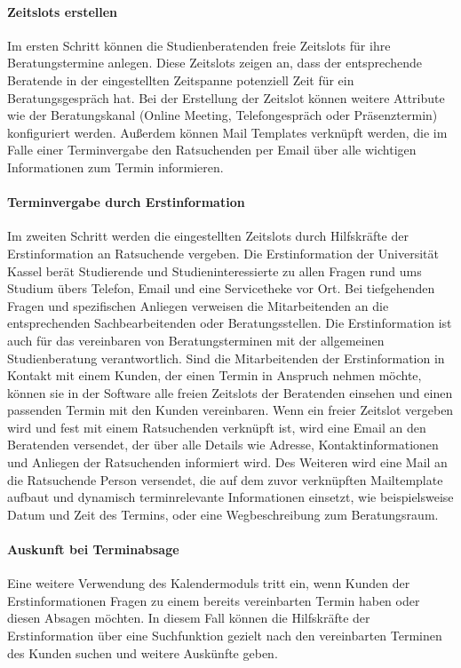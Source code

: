 \documentclass[12pt]{article}
\begin{document}
\paragraph{Zeitslots erstellen}
Im ersten Schritt können die Studienberatenden freie Zeitslots für ihre
Beratungstermine anlegen. Diese Zeitslots zeigen an, dass der entsprechende
Beratende in der eingestellten Zeitspanne potenziell Zeit für ein
Beratungsgespräch hat. Bei der Erstellung der Zeitslot können weitere Attribute
wie der Beratungskanal (Online Meeting, Telefongespräch oder Präsenztermin)
konfiguriert werden. Außerdem können Mail Templates verknüpft werden, die im
Falle einer Terminvergabe den Ratsuchenden per Email über alle wichtigen
Informationen zum Termin informieren.

\paragraph{Terminvergabe durch Erstinformation}
Im zweiten Schritt werden die eingestellten Zeitslots durch Hilfskräfte der
Erstinformation an Ratsuchende vergeben. Die Erstinformation der Universität
Kassel berät Studierende und Studieninteressierte zu allen Fragen rund ums
Studium übers Telefon, Email und eine Servicetheke vor Ort. Bei tiefgehenden
Fragen und spezifischen Anliegen verweisen die Mitarbeitenden an die
entsprechenden Sachbearbeitenden oder Beratungsstellen. Die Erstinformation ist
auch für das vereinbaren von Beratungsterminen mit der allgemeinen
Studienberatung verantwortlich. Sind die Mitarbeitenden der Erstinformation in
Kontakt mit einem Kunden, der einen Termin in Anspruch nehmen möchte, können
sie in der Software alle freien Zeitslots der Beratenden einsehen und einen
passenden Termin mit den Kunden vereinbaren. Wenn ein freier Zeitslot vergeben
wird und fest mit einem Ratsuchenden verknüpft ist, wird eine Email an den
Beratenden versendet, der über alle Details wie Adresse, Kontaktinformationen
und Anliegen der Ratsuchenden informiert wird. Des Weiteren wird eine Mail an
die Ratsuchende Person versendet, die auf dem zuvor verknüpften Mailtemplate
aufbaut und dynamisch terminrelevante Informationen einsetzt, wie
beispielsweise Datum und Zeit des Termins, oder eine Wegbeschreibung zum
Beratungsraum.

\paragraph{Auskunft bei Terminabsage}
Eine weitere Verwendung des Kalendermoduls tritt ein, wenn Kunden der
Erstinformationen Fragen zu einem bereits vereinbarten Termin haben oder diesen
Absagen möchten. In diesem Fall können die Hilfskräfte der Erstinformation über
eine Suchfunktion gezielt nach den vereinbarten Terminen des Kunden suchen und
weitere Auskünfte geben.
\end{document}
